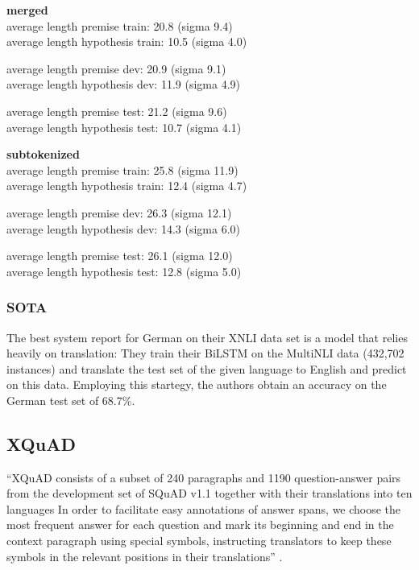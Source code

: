 \textbf{merged} \\
average length premise train: 20.8 (sigma 9.4) \\
average length hypothesis train: 10.5 (sigma 4.0)

average length premise dev: 20.9 (sigma 9.1) \\
average length hypothesis dev: 11.9 (sigma 4.9)

average length premise test: 21.2 (sigma 9.6) \\
average length hypothesis test: 10.7 (sigma 4.1)


\textbf{subtokenized} \\
average length premise train: 25.8 (sigma 11.9) \\
average length hypothesis train: 12.4 (sigma 4.7)

average length premise dev: 26.3 (sigma 12.1) \\
average length hypothesis dev: 14.3 (sigma 6.0)

average length premise test: 26.1 (sigma 12.0) \\
average length hypothesis test: 12.8 (sigma 5.0)

\subsubsection{SOTA}

The best system \cite{conneau2018xnli} report for German on their XNLI data set is a model that relies heavily on translation:
They train their BiLSTM on the MultiNLI data (432,702 instances) and translate the test set of the given language to English and predict on this data.
Employing this startegy, the authors obtain an accuracy on the German test set of 68.7\%.



\subsection{XQuAD}

``XQuAD consists of a subset of 240 paragraphs and 1190 question-answer pairs from the development set of SQuAD v1.1 together with their translations into ten languages \textelp{} In order to facilitate easy annotations of answer spans, we choose the most frequent answer for each question and mark its beginning and end in the context paragraph using special symbols, instructing translators to keep these symbols in the relevant positions in their translations'' \cite{artetxe2019cross}.

